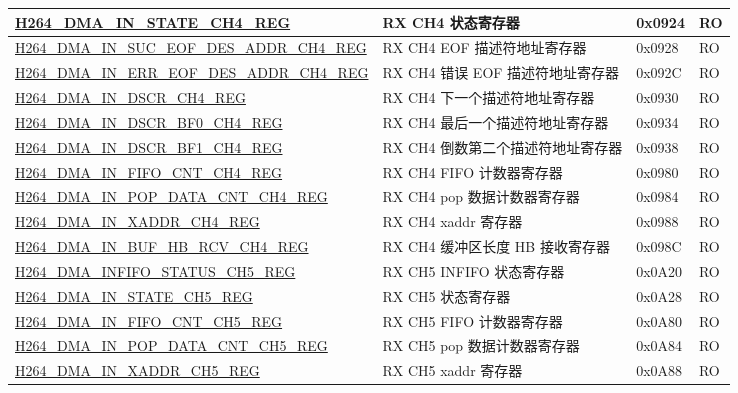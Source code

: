 \begin{longtable}{ | p{7.5cm} | p{5.7cm} | p{1.2cm} | p{1cm} | }
    \hyperref[regdesc:H264DMAINSTATECH4REG]{H264\_DMA\_IN\_STATE\_CH4\_REG} & RX CH4 状态寄存器 & 0x0924 & RO \\ \hline
    \hyperref[regdesc:H264DMAINSUCEOFDESADDRCH4REG]{H264\_DMA\_IN\_SUC\_EOF\_DES\_ADDR\_CH4\_REG} & RX CH4 EOF 描述符地址寄存器 & 0x0928 & RO \\ \hline
    \hyperref[regdesc:H264DMAINERREOFDESADDRCH4REG]{H264\_DMA\_IN\_ERR\_EOF\_DES\_ADDR\_CH4\_REG} & RX CH4 错误 EOF 描述符地址寄存器 & 0x092C & RO \\ \hline
    \hyperref[regdesc:H264DMAINDSCRCH4REG]{H264\_DMA\_IN\_DSCR\_CH4\_REG} & RX CH4 下一个描述符地址寄存器 & 0x0930 & RO \\ \hline
    \hyperref[regdesc:H264DMAINDSCRBF0CH4REG]{H264\_DMA\_IN\_DSCR\_BF0\_CH4\_REG} & RX CH4 最后一个描述符地址寄存器 & 0x0934 & RO \\ \hline
    \hyperref[regdesc:H264DMAINDSCRBF1CH4REG]{H264\_DMA\_IN\_DSCR\_BF1\_CH4\_REG} & RX CH4 倒数第二个描述符地址寄存器 & 0x0938 & RO \\ \hline
    \hyperref[regdesc:H264DMAINFIFOCNTCH4REG]{H264\_DMA\_IN\_FIFO\_CNT\_CH4\_REG} & RX CH4 FIFO 计数器寄存器 & 0x0980 & RO \\ \hline
    \hyperref[regdesc:H264DMAINPOPDATACNTCH4REG]{H264\_DMA\_IN\_POP\_DATA\_CNT\_CH4\_REG} & RX CH4 pop 数据计数器寄存器 & 0x0984 & RO \\ \hline
    \hyperref[regdesc:H264DMAINXADDRCH4REG]{H264\_DMA\_IN\_XADDR\_CH4\_REG} & RX CH4 xaddr 寄存器 & 0x0988 & RO \\ \hline
    \hyperref[regdesc:H264DMAINBUFHBRCVCH4REG]{H264\_DMA\_IN\_BUF\_HB\_RCV\_CH4\_REG} & RX CH4  缓冲区长度 HB 接收寄存器 & 0x098C & RO \\ \hline
    \hyperref[regdesc:H264DMAINFIFOSTATUSCH5REG]{H264\_DMA\_INFIFO\_STATUS\_CH5\_REG} & RX CH5 INFIFO 状态寄存器 & 0x0A20 & RO \\ \hline
    \hyperref[regdesc:H264DMAINSTATECH5REG]{H264\_DMA\_IN\_STATE\_CH5\_REG} & RX CH5 状态寄存器 & 0x0A28 & RO \\ \hline
    \hyperref[regdesc:H264DMAINFIFOCNTCH5REG]{H264\_DMA\_IN\_FIFO\_CNT\_CH5\_REG} & RX CH5 FIFO 计数器寄存器 & 0x0A80 & RO \\ \hline
    \hyperref[regdesc:H264DMAINPOPDATACNTCH5REG]{H264\_DMA\_IN\_POP\_DATA\_CNT\_CH5\_REG} & RX CH5 pop 数据计数器寄存器 & 0x0A84 & RO \\ \hline
    \hyperref[regdesc:H264DMAINXADDRCH5REG]{H264\_DMA\_IN\_XADDR\_CH5\_REG} & RX CH5 xaddr 寄存器 & 0x0A88 & RO \\ \hline

\end{longtable}
